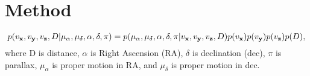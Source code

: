 \section{Method}

\begin{equation}
p(v_{\bf x}, v_{\bf y}, v_{\bf z}, D | \mu_{\alpha}, \mu_{\delta}, \alpha,
\delta, \pi) = p(\mu_{\alpha}, \mu_{\delta}, \alpha, \delta, \pi | v_{\bf x},
v_{\bf y}, v_{\bf z}, D) p(v_{\bf x}) p(v_{\bf y}) p(v_{\bf z}) p(D),
\end{equation}
where D is distance, $\alpha$ is Right Ascension (RA), $\delta$ is declination
(dec), $\pi$ is parallax, $\mu_\alpha$ is proper motion in RA, and
$\mu_\delta$ is proper motion in dec.

